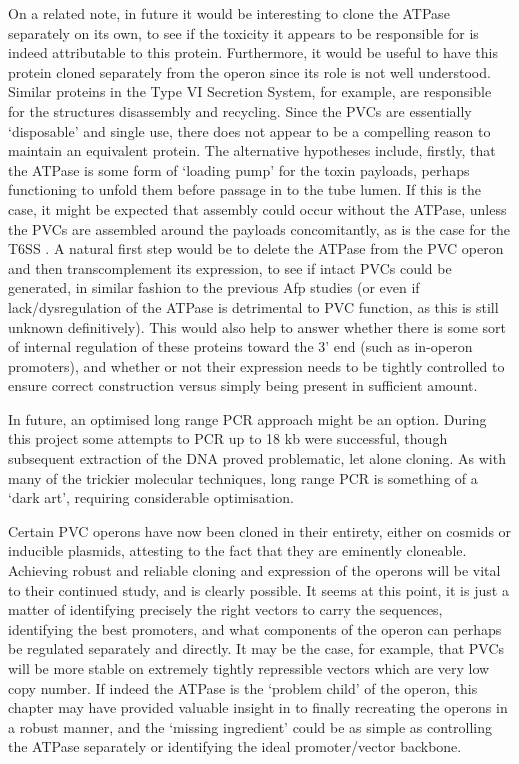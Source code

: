 On a related note, in future it would be interesting to clone the ATPase separately on its own, to see if the toxicity it appears to be responsible for is indeed attributable to this protein. Furthermore, it would be useful to have this protein cloned separately from the operon since its role is not well understood. Similar proteins in the Type VI Secretion System, for example, are responsible for the structures disassembly and recycling. Since the PVCs are essentially `disposable' and single use, there does not appear to be a compelling reason to maintain an equivalent protein. The alternative hypotheses include, firstly, that the ATPase is some form of `loading pump' for the toxin payloads, perhaps functioning to unfold them before passage in to the tube lumen. If this is the case, it might be expected that assembly could occur without the ATPase, unless the PVCs are assembled around the payloads concomitantly, as is the case for the T6SS \citep{Basler2015a}. A natural first step would be to delete the ATPase from the PVC operon and then transcomplement its expression, to see if intact PVCs could be generated, in similar fashion to the previous Afp studies (or even if lack/dysregulation of the ATPase is detrimental to PVC function, as this is still unknown definitively). This would also help to answer whether there is some sort of internal regulation of these proteins toward the 3' end (such as in-operon promoters), and whether or not their expression needs to be tightly controlled to ensure correct construction versus simply being present in sufficient amount.

In future, an optimised long range PCR approach might be an option. During this project some attempts to PCR up to 18 kb were successful, though subsequent extraction of the DNA proved problematic, let alone cloning. As with many of the trickier molecular techniques, long range PCR is something of a `dark art', requiring considerable optimisation.

Certain PVC operons have now been cloned in their entirety, either on cosmids or inducible plasmids, attesting to the fact that they are eminently cloneable. Achieving robust and reliable cloning and expression of the operons will be vital to their continued study, and is clearly possible. It seems at this point, it is just a matter of identifying precisely the right vectors to carry the sequences, identifying the best promoters, and what components of the operon can perhaps be regulated separately and directly. It may be the case, for example, that PVCs will be more stable on extremely tightly repressible vectors which are very low copy number. If indeed the ATPase is the `problem child' of the operon, this chapter may have provided valuable insight in to finally recreating the operons in a robust manner, and the `missing ingredient' could be as simple as controlling the ATPase separately or identifying the ideal promoter/vector backbone.

